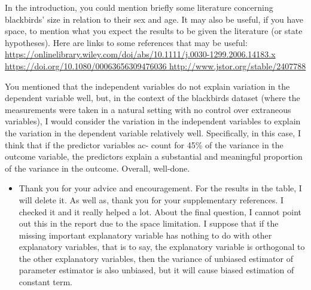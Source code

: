 In the introduction, you could mention briefly some literature concerning blackbirds’ size in relation to their sex and age. It may also be useful, if you have space, to mention what you expect the results to be given the literature (or state hypotheses). Here are links to some references that may be useful: \url{https://onlinelibrary.wiley.com/doi/abs/10.1111/j.0030-1299.2006.14183.x https://doi.org/10.1080/00063656309476036 http://www.jstor.org/stable/2407788}

You mentioned that the independent variables do not explain variation in the dependent variable well, but, in the context of the blackbirds dataset (where the measurements were taken in a natural setting with no control over extraneous variables), I would consider the variation in the independent variables to explain the variation in the dependent variable relatively well. Specifically, in this case, I think that if the predictor variables ac- count for 45\% of the variance in the outcome variable, the predictors explain a substantial and meaningful proportion of the variance in the outcome. Overall, well-done.

\begin{itemize}
	\item \textcolor[rgb]{1,0,0}{Thank you for your advice and encouragement. For the results in the table, I will delete it. As well as, thank you for your supplementary references. I checked it and it really helped a lot. About the final question, I cannot point out this in the report due to the space limitation. I suppose that if the missing important explanatory variable has nothing to do with other explanatory variables, that is to say, the explanatory variable is orthogonal to the other explanatory variables, then the variance of unbiased estimator of parameter estimator is also unbiased, but it will cause biased estimation of constant term.}
\end{itemize}
